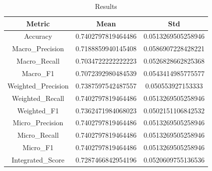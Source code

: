 \begin{table}[htbp]
\centering
\caption{Results}
\label{tab:csv}
\small
\setlength{\tabcolsep}{4pt}
\begin{tabular}{|c|c|c|}
\hline
Metric & Mean & Std \\
\hline
Accuracy & 0.7402797819464486 & 0.0513269505258946 \\
Macro_Precision & 0.7188859940145408 & 0.0586907228428221 \\
Macro_Recall & 0.7034722222222223 & 0.0526828662825368 \\
Macro_F1 & 0.7072392980484539 & 0.0543414985775577 \\
Weighted_Precision & 0.7387597542487557 & 0.050553927153333 \\
Weighted_Recall & 0.7402797819464486 & 0.0513269505258946 \\
Weighted_F1 & 0.7362471984068023 & 0.0502151106842532 \\
Micro_Precision & 0.7402797819464486 & 0.0513269505258946 \\
Micro_Recall & 0.7402797819464486 & 0.0513269505258946 \\
Micro_F1 & 0.7402797819464486 & 0.0513269505258946 \\
Integrated_Score & 0.7287466842954196 & 0.0520609755136536 \\
\hline
\end{tabular}
\end{table}